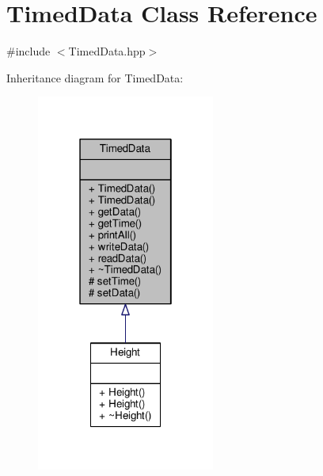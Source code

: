 \hypertarget{classTimedData}{\section{Timed\+Data Class Reference}
\label{classTimedData}
}


{\ttfamily \#include $<$Timed\+Data.\+hpp$>$}



Inheritance diagram for Timed\+Data\+:\nopagebreak
\begin{figure}[H]
\begin{center}
\leavevmode
\includegraphics[width=166pt]{classTimedData__inherit__graph}
\end{center}
\end{figure}
